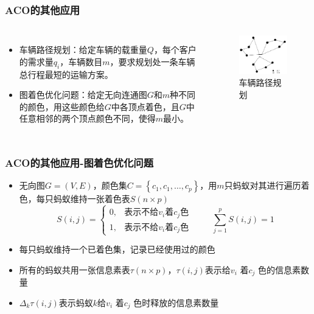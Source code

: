 \begin{frame}
	\frametitle{ACO的其他应用}
	\begin{columns}
		\begin{itemize}
			\item {车辆路径规划：给定车辆的载重量$Q$，每个客户的需求量$q_i$，车辆数目$m$，要求规划处一条车辆总行程最短的运输方案。}
			\item {图着色优化问题：给定无向连通图$G$和$m$种不同的颜色，用这些颜色给$G$中各顶点着色，且$G$中任意相邻的两个顶点颜色不同，使得$m$最小。}
		\end{itemize}
		\begin{figure}[htbp]
			\centering
			\includegraphics[width=6cm]{pic/ant6.jpg}
			\caption{车辆路径规划}
		\end{figure}
	\end{columns}	
\end{frame}


\begin{frame}
	\frametitle{ACO的其他应用-图着色优化问题}
	\begin{itemize}
		\item {无向图$G=(V,E)$，颜色集$C=\left\{ c_1,c_1,…,c_p \right\}$，用$m$只蚂蚁对其进行遍历着色，每只蚂蚁维持一张着色表$S(n \times p)$
		$$
		S(i,j) =
		\begin{cases}
		0,  & \text{表示不给$v_i$着$c_j$色 } \\
		1, & \text{表示不给$v_i$着$c_j$色}
		\end{cases}
		\qquad \sum_{j=1}^{p}S(i,j)=1
		$$}
		\item {每只蚂蚁维持一个已着色集，记录已经使用过的颜色}		
		\item {所有的蚂蚁共用一张信息素表$\tau (n\times p)$，$\tau (i,j)$表示给$v_i$ 着$c_j$ 色的信息素数量}
		\item {$\Delta_k \tau (i,j)$表示蚂蚁$k$给$v_i$ 着$c_j$ 色时释放的信息素数量}
	\end{itemize}
\end{frame}


